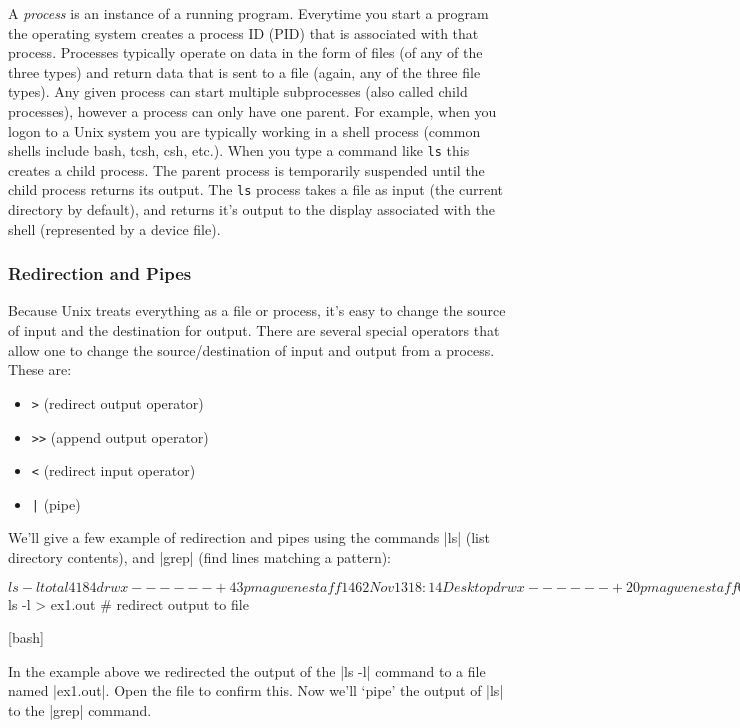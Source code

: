 A \emph{process} is an instance of a running program.  Everytime you start a program the operating system creates a process ID (PID) that is associated with that process. Processes typically operate on data in the form of files (of any of the three types) and return data that is sent to a file (again, any of the three file types). Any given process can start multiple subprocesses (also called child processes), however a process can only have one parent. For example, when you logon to a Unix system you are typically working in a shell process (common shells include bash, tcsh, csh, etc.). When you type a command like \verb=ls= this creates a child process. The parent process is temporarily suspended until the child process returns its output. The \verb=ls= process takes a file as input (the current directory by default), and returns it's output to the display associated with the shell (represented by a device file).


\subsubsection{Redirection and Pipes}

Because Unix treats everything as a file or process, it's easy to change the source of input and the destination for output. There are several special operators that allow one to change the source/destination of input and output from a process. These are:

\begin{itemize}
    \item \verb=>= (redirect output operator)
    \item \verb=>>= (append output operator)
    \item \verb=<= (redirect input operator)
    \item \verb=|= (pipe)
\end{itemize}

We'll give a few example of redirection and pipes using the commands |ls| (list directory contents), and |grep| (find lines matching a pattern):

\begin{tinycode}[bash]
$ ls -l
total 4184
drwx------+   43 pmagwene  staff     1462 Nov 13 18:14 Desktop
drwx------+   20 pmagwene  staff      680 Sep 23 12:32 Documents
... output truncated ...
$ ls -l > ex1.out # redirect output to file
\end{tinycode}[bash]

In the example above we redirected the output of the |ls -l| command to a file named |ex1.out|.  Open the file to confirm this.  Now we'll `pipe' the output of |ls| to the |grep| command.

